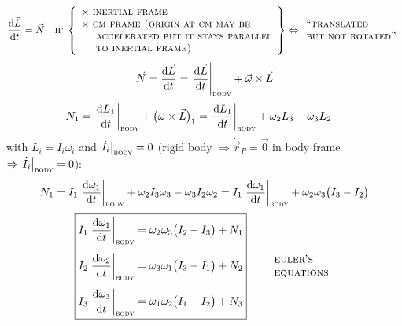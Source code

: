 \documentclass[11pt]{article}
\begin{document}
\begin{equation*}
\frac{\mathrm{d}\vec{L}}{\mathrm{d} t} = \vec{N}
\quad
\textsc{if}\;
\left\{
\begin{array}{l}
\times\ \textsc{inertial frame}\\
\times\ \textsc{cm frame (origin at cm may be}\\
\phantom{\times\ }\ \textsc{accelerated but it stays parallel}\\
\phantom{\times\ }\ \textsc{to inertial frame)}
\end{array}\right\}
\Leftrightarrow
\begin{array}{l}\text{``\textsc{translated}}\\ \textsc{but not rotated''}\end{array}
\end{equation*}
\begin{equation*}
\vec{N} = \frac{\mathrm{d}\vec{L}}{\mathrm{d} t}
= \left.\frac{\mathrm{d}\vec{L}}{\mathrm{d} t}\right|_{\textsc{body}} + \vec{\omega}\times\vec{L}
\end{equation*}
\begin{align*}
N_1 &= \left.\frac{\mathrm{d} L_1}{\mathrm{d} t}\right|_{\textsc{body}} + \bigl(\vec{\omega}\times\vec{L}\bigr)_1
= \left.\frac{\mathrm{d} L_1}{\mathrm{d} t}\right|_{\textsc{body}} + \omega_2 L_3 - \omega_3 L_2
\end{align*}
with $L_i = I_i\omega_i$ and $\left.\dot{I}_i\right|_{\textsc{body}} = 0$
(rigid body $\Rightarrow \dot{\vec{r}}_P = \vec{0}$ in body frame
$\Rightarrow \left.\dot{I}_i\right|_{\textsc{body}} = 0$):
\begin{equation*}
N_1 = I_1\left.\frac{\mathrm{d}\omega_1}{\mathrm{d} t}\right|_{\textsc{body}} + \omega_2 I_3\omega_3 - \omega_3 I_2\omega_2
= I_1\left.\frac{\mathrm{d}\omega_1}{\mathrm{d} t}\right|_{\textsc{body}} + \omega_2\omega_3\bigl(I_3-I_2\bigr)
\end{equation*}
\begin{equation*}
\boxed{
\begin{aligned}
I_1\left.\frac{\mathrm{d}\omega_1}{\mathrm{d} t}\right|_{\textsc{body}} &= \omega_2\omega_3\bigl(I_2-I_3\bigr) + N_1\\[4pt]
I_2\left.\frac{\mathrm{d}\omega_2}{\mathrm{d} t}\right|_{\textsc{body}} &= \omega_3\omega_1\bigl(I_3-I_1\bigr) + N_2\\[4pt]
I_3\left.\frac{\mathrm{d}\omega_3}{\mathrm{d} t}\right|_{\textsc{body}} &= \omega_1\omega_2\bigl(I_1-I_2\bigr) + N_3
\end{aligned}}
\qquad
\begin{array}{l}\textsc{euler's}\\ \textsc{equations}\end{array}
\end{equation*}
\end{document}
